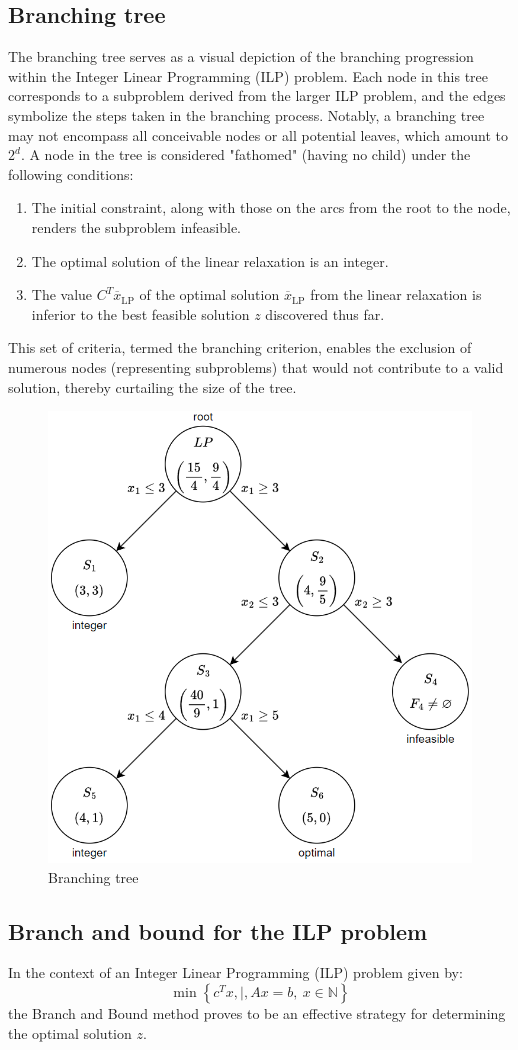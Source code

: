 \subsection{Branching tree}
The branching tree serves as a visual depiction of the branching progression within the Integer Linear Programming (ILP) problem. 
Each node in this tree corresponds to a subproblem derived from the larger ILP problem, and the edges symbolize the steps taken in the branching process.
Notably, a branching tree may not encompass all conceivable nodes or all potential leaves, which amount to $2^d$. 
A node in the tree is considered "fathomed" (having no child) under the following conditions:
\begin{enumerate}
    \item The initial constraint, along with those on the arcs from the root to the node, renders the subproblem infeasible.
    \item The optimal solution of the linear relaxation is an integer.
    \item The value $C^T \overline{x}_{\text{LP}}$ of the optimal solution $\overline{x}_{\text{LP}}$ from the linear relaxation is inferior to the best feasible solution $z$ discovered thus far.
\end{enumerate}
This set of criteria, termed the branching criterion, enables the exclusion of numerous nodes (representing subproblems) that would not contribute to a valid solution, thereby curtailing the size of the tree.
\begin{figure}[H]
    \centering
    \includegraphics[width=0.5\linewidth]{images/ilp3.png}
    \caption{Branching tree}
\end{figure}

\subsection{Branch and bound for the ILP problem}
In the context of an Integer Linear Programming (ILP) problem given by:
\[ \min\left\{ c^T x, \mid, Ax = b, \ x \in \mathbb{N} \right\} \]
the Branch and Bound method proves to be an effective strategy for determining the optimal solution $z$.

